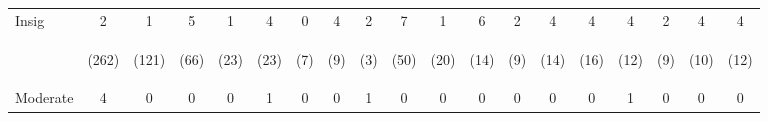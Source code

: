 \begin{tabular}{lcccccccccccccccccc}
\hline \noalign{\smallskip}Insig & 2 & 1 & 5 & 1 & 4 & 0 & 4 & 2 & 7 & 1 & 6 & 2 & 4 & 4 & 4 & 2 & 4 & 4\\
 & \begin{footnotesize}(262)\end{footnotesize} & \begin{footnotesize}(121)\end{footnotesize} & \begin{footnotesize}(66)\end{footnotesize} & \begin{footnotesize}(23)\end{footnotesize} & \begin{footnotesize}(23)\end{footnotesize} & \begin{footnotesize}(7)\end{footnotesize} & \begin{footnotesize}(9)\end{footnotesize} & \begin{footnotesize}(3)\end{footnotesize} & \begin{footnotesize}(50)\end{footnotesize} & \begin{footnotesize}(20)\end{footnotesize} & \begin{footnotesize}(14)\end{footnotesize} & \begin{footnotesize}(9)\end{footnotesize} & \begin{footnotesize}(14)\end{footnotesize} & \begin{footnotesize}(16)\end{footnotesize} & \begin{footnotesize}(12)\end{footnotesize} & \begin{footnotesize}(9)\end{footnotesize} & \begin{footnotesize}(10)\end{footnotesize} & \begin{footnotesize}(12)\end{footnotesize}\\
\noalign{\smallskip}Moderate & 4 & 0 & 0 & 0 & 1 & 0 & 0 & 1 & 0 & 0 & 0 & 0 & 0 & 0 & 1 & 0 & 0 & 0\\

\end{tabular}
